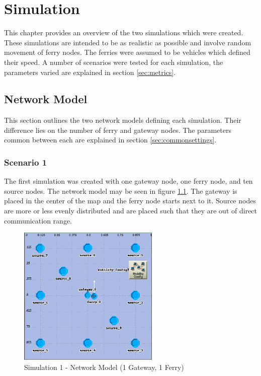 \chapter{Simulation}


This chapter provides an overview of the two simulations which were created.
These simulations are intended to be as realistic as possible and involve random movement of ferry nodes.
The ferries were assumed to be vehicles which defined their speed.
A number of scenarios were tested for each simulation, the parameters varied are explained in section \ref{sec:metrics}.

\section{Network Model}
\label{sec:main_net_model}

This section outlines the two network models defining each simulation. 
Their difference lies on the number of ferry and gateway nodes.
The parameters common between each are explained in section \ref{sec:commonsettings}.

\subsection{Scenario 1}		%

The first simulation was created with one gateway node, one ferry node, and ten source nodes.
The network model may be seen in figure \ref{fig:scenario2}.
The gateway is placed in the center of the map and the ferry node starts next to it.
Source nodes are more or less evenly distributed and are placed such that they are out of direct communication range.

\begin{figure}[ht]
    \centering
    \includegraphics[width=0.6\textwidth]{images/scenario2-top.png}
    \caption{Simulation 1 - Network Model (1 Gateway, 1 Ferry)}
    \label{fig:scenario2}
\end{figure}

